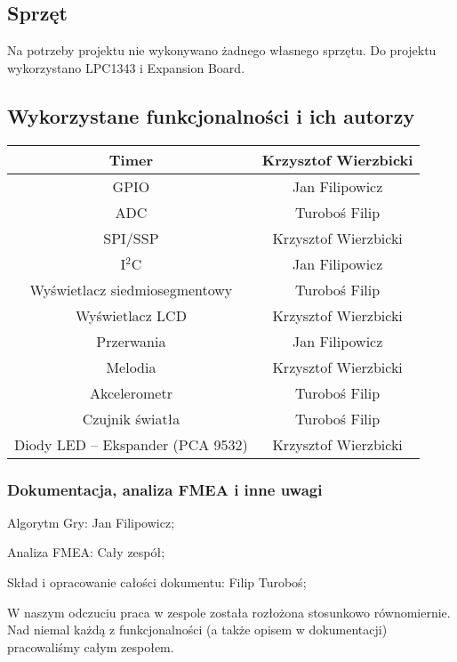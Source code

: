 \documentclass[a4paper,12pt,twoside]{article}
\theoremstyle{plain}
\theoremstyle{definition}
\theoremstyle{remark}
\begin{document}
\subsection{Sprzęt}
Na potrzeby projektu nie wykonywano żadnego własnego sprzętu.
Do projektu wykorzystano LPC1343 i Expansion Board.
\subsection{Wykorzystane funkcjonalności i ich autorzy}

\begin{tabular}{|c|c|} \hline
	 Timer&{Krzysztof Wierzbicki}\\ \hline
	 GPIO&{Jan Filipowicz}\\ \hline
	 ADC&{Turoboś Filip}\\ \hline
	 SPI/SSP&{Krzysztof Wierzbicki}\\ \hline
	 I$^2$C&{Jan Filipowicz}\\ \hline
	 Wyświetlacz siedmiosegmentowy&{Turoboś Filip}\\ \hline
	 Wyświetlacz LCD&{Krzysztof Wierzbicki}\\ \hline
	 Przerwania&{Jan Filipowicz}\\ \hline
	 Melodia&{Krzysztof Wierzbicki}\\ \hline
	 Akcelerometr&{Turoboś Filip}\\ \hline
	 Czujnik światła&{Turoboś Filip}\\ \hline
	 Diody LED -- Ekspander (PCA 9532)&{Krzysztof Wierzbicki}\\ \hline
\end{tabular}
\subsubsection{Dokumentacja, analiza FMEA i inne uwagi}
Algorytm Gry: Jan Filipowicz;

\noindent Analiza FMEA: Cały zespół;

\noindent Skład i opracowanie całości dokumentu: Filip Turoboś;

W naszym odczuciu praca w zespole została rozłożona stosunkowo równomiernie. Nad niemal każdą z funkcjonalności (a także opisem w dokumentacji) pracowaliśmy całym zespołem.
\end{document}
